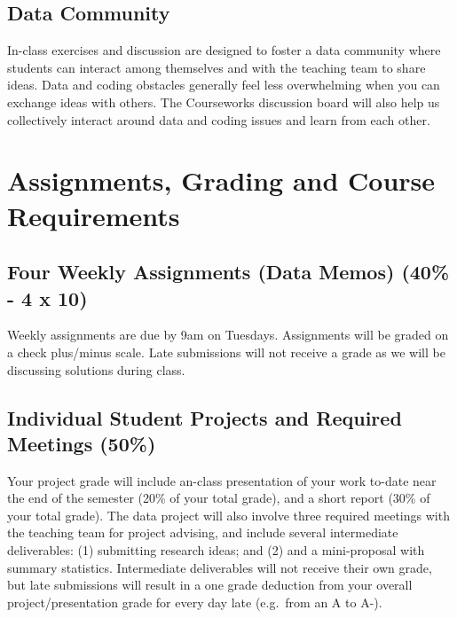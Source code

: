 \documentclass[11pt,]{article}
\begin{document}
\hypertarget{data-community}{%
\subsection{Data Community}\label{data-community}}

In-class exercises and discussion are designed to foster a data
community where students can interact among themselves and with the
teaching team to share ideas. Data and coding obstacles generally feel
less overwhelming when you can exchange ideas with others. The
Courseworks discussion board will also help us collectively interact
around data and coding issues and learn from each other.

\hypertarget{assignments-grading-and-course-requirements}{%
\section{Assignments, Grading and Course
Requirements}\label{assignments-grading-and-course-requirements}}

\hypertarget{four-weekly-assignments-data-memos-40---4-x-10}{%
\subsection{Four Weekly Assignments (Data Memos) (40\% - 4 x
10)}\label{four-weekly-assignments-data-memos-40---4-x-10}}

Weekly assignments are due by 9am on Tuesdays. Assignments will be
graded on a check plus/minus scale. Late submissions will not receive a
grade as we will be discussing solutions during class.

\hypertarget{individual-student-projects-and-required-meetings-50}{%
\subsection{Individual Student Projects and Required Meetings
(50\%)}\label{individual-student-projects-and-required-meetings-50}}

Your project grade will include an-class presentation of your work
to-date near the end of the semester (20\% of your total grade), and a
short report (30\% of your total grade). The data project will also
involve three required meetings with the teaching team for project
advising, and include several intermediate deliverables: (1) submitting
research ideas; and (2) and a mini-proposal with summary statistics.
Intermediate deliverables will not receive their own grade, but late
submissions will result in a one grade deduction from your overall
project/presentation grade for every day late (e.g.~from an A to A-).
\end{document}
